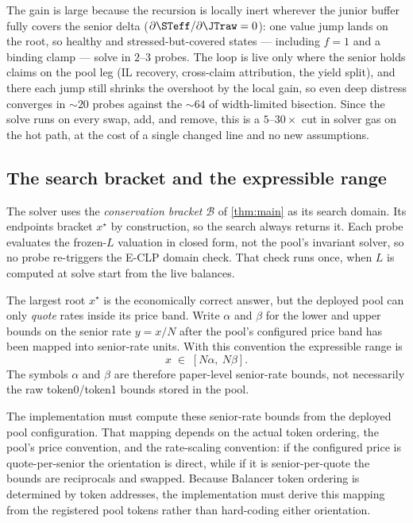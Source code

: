 The gain is large because the recursion is locally inert wherever the
junior buffer fully covers the senior delta
($\partial \STeff / \partial \JTraw = 0$): one value jump lands on the
root, so healthy and stressed-but-covered states --- including $f = 1$
and a binding clamp --- solve in $2$--$3$ probes. The loop is live only
where the senior holds claims on the pool leg (IL recovery, cross-claim
attribution, the yield split), and there each jump still shrinks the
overshoot by the local gain, so even deep distress converges in $\sim 20$
probes against the $\sim 64$ of width-limited bisection. Since the solve
runs on every swap, add, and remove, this is a $5$--$30\times$ cut in
solver gas on the hot path, at the cost of a single changed line and no
new assumptions.

\subsection{The search bracket and the expressible range}
\label{sec:solver:bracket}

The solver uses the \emph{conservation bracket} $\mathcal{B}$ of
\cref{thm:main} as its search domain. Its endpoints bracket $x^\star$ by
construction, so the search always returns it. Each probe
evaluates the frozen-$L$ valuation in closed form, not the pool's
invariant solver, so no probe re-triggers the E-CLP domain check. That
check runs once, when $L$ is computed at solve start from the live
balances.

The largest root $x^\star$ is the economically correct answer, but the
deployed pool can only \emph{quote} rates inside its price band. Write
$\alpha$ and $\beta$ for the lower and upper bounds on the senior rate
$y = x/N$ after the pool's configured price band has been mapped into
senior-rate units. With this convention the expressible range is
\begin{equation}
  x \;\in\; [N\alpha,\ N\beta].
\end{equation}
The symbols $\alpha$ and $\beta$ are therefore paper-level senior-rate
bounds, not necessarily the raw token0/token1 bounds stored in the pool.

The implementation must compute these senior-rate bounds from the
deployed pool configuration. That mapping depends on the actual token
ordering, the pool's price convention, and the rate-scaling convention:
if the configured price is quote-per-senior the orientation is direct,
while if it is senior-per-quote the bounds are reciprocals and swapped.
Because Balancer token ordering is determined by token addresses, the
implementation must derive this mapping from the registered pool tokens
rather than hard-coding either orientation.

